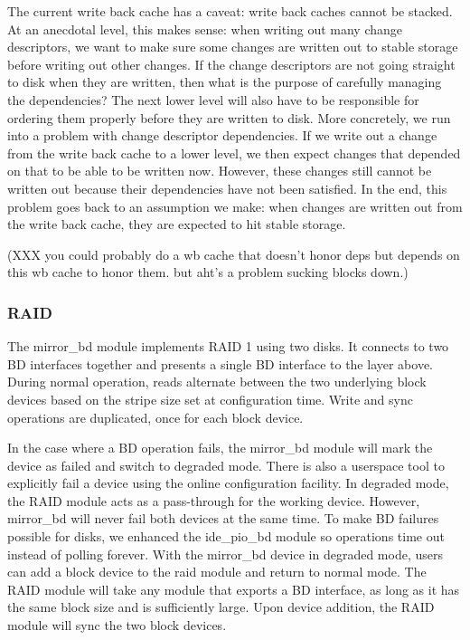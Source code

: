 The current write back cache has a caveat: write back caches cannot be stacked.
At an anecdotal level, this makes sense: when writing out many change
descriptors, we want to make sure some changes are written out to stable storage
before writing out other changes. If the change descriptors are not going
straight to disk when they are written, then what is the purpose of carefully
managing the dependencies? The next lower level will also have to be responsible
for ordering them properly before they are written to disk. More concretely, we
run into a problem with change descriptor dependencies. If we write out a change
from the write back cache to a lower level, we then expect changes that depended
on that to be able to be written now. However, these changes still cannot be
written out because their dependencies have not been satisfied. In the end, this
problem goes back to an assumption we make: when changes are written out from
the write back cache, they are expected to hit stable storage.

(XXX you could probably do a wb cache that doesn't honor deps but depends on
this wb cache to honor them. but aht's a problem sucking blocks down.)

\subsubsection{RAID}
\label{sec:solution:impl:raid}

The mirror\_bd module implements RAID 1 using two disks. It connects to two
BD interfaces together and presents a single BD interface to the layer above.
During normal operation, reads alternate between the two underlying block
devices based on the stripe size set at configuration time. Write and sync
operations are duplicated, once for each block device.

In the case where a BD operation fails, the mirror\_bd module will mark the
device as failed and switch to degraded mode. There is also a userspace tool to
explicitly fail a device using the online configuration facility. In degraded
mode, the RAID module acts as a pass-through for the working device. However,
mirror\_bd will never fail both devices at the same time. To make BD failures
possible for disks, we enhanced the ide\_pio\_bd module so operations time out
instead of polling forever. With the mirror\_bd device in degraded mode, users
can add a block device to the raid module and return to normal mode. The RAID
module will take any module that exports a BD interface, as long as it has the
same block size and is sufficiently large. Upon device addition, the RAID module
will sync the two block devices.

